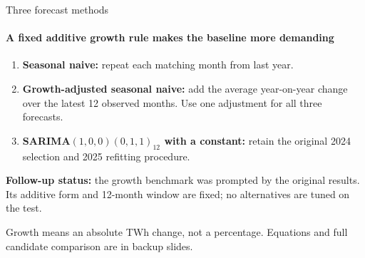 \documentclass[aspectratio=169,10pt]{beamer}
\newcommand{\Source}[1]{\par\vfill{\fontsize{6.5}{7.5}\selectfont\color{black!65}#1\par}}
\begin{document}
\begin{frame}[t]{Three forecast methods}
\framesubtitle{A fixed additive growth rule makes the baseline more demanding}
\begin{enumerate}
\item \textbf{Seasonal naive:} repeat each matching month from last year.
\item \textbf{Growth-adjusted seasonal naive:} add the average year-on-year change over the latest 12 observed months. Use one adjustment for all three forecasts.
\item \textbf{SARIMA$(1,0,0)(0,1,1)_{12}$ with a constant:} retain the original 2024 selection and 2025 refitting procedure.
\end{enumerate}
\par\medskip
\textbf{Follow-up status:} the growth benchmark was prompted by the original results. Its additive form and 12-month window are fixed; no alternatives are tuned on the test.
\Source{Growth means an absolute TWh change, not a percentage. Equations and full candidate comparison are in backup slides.}
\end{frame}
\end{document}
